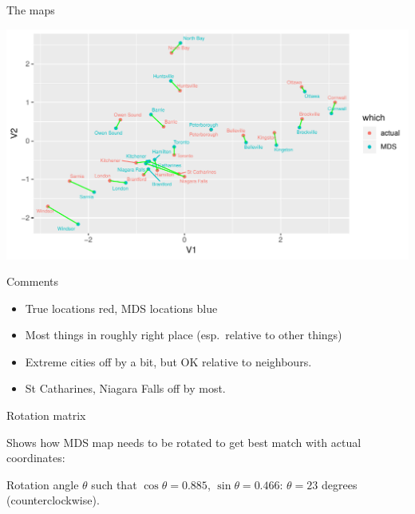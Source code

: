 \begin{frame}{The maps}
 
\begin{knitrout}
\color{fgcolor}
\includegraphics[width=\maxwidth]{figure/prosesto-1} 

\end{knitrout}
  
  
  
\end{frame}

\begin{frame}[fragile]{Comments}
  
  \begin{itemize}
  \item True locations red, MDS locations blue
  \item Most things in roughly right place (esp.\ relative to other things)
  \item Extreme cities off by a bit, but OK relative to neighbours.
  \item St Catharines, Niagara Falls off by most.
  \end{itemize}
  
\end{frame}

\begin{frame}[fragile]{Rotation matrix}
  
  Shows how MDS map needs to be rotated to get best match with actual coordinates:
  
\begin{knitrout}
\color{fgcolor}\begin{kframe}
\begin{alltt}
\hlopt{$}
\end{alltt}


{\ttfamily\noindent\bfseries\color{errorcolor}{\#\# Error in eval(expr, envir, enclos): object 'ontario.pro' not found}}\end{kframe}
\end{knitrout}

Rotation angle $\theta$ such that $\cos\theta=0.885$,
$\sin\theta=0.466$: $\theta=23$ degrees (counterclockwise). 
  
\end{frame}

